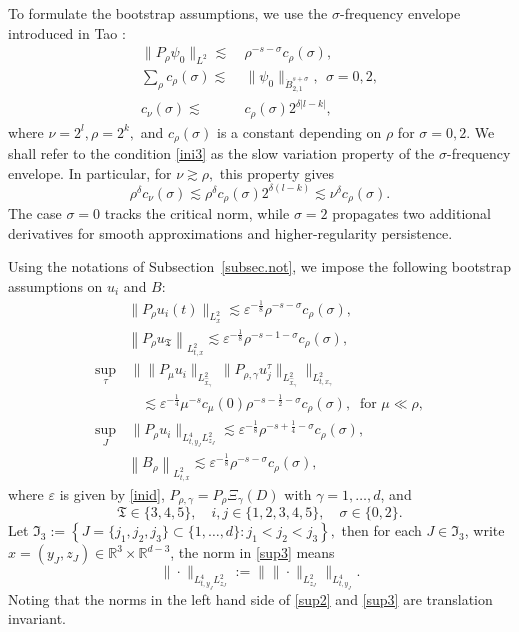 \documentclass[11pt,letterpaper,reqno]{amsart}
\numberwithin{equation}{section}
\theoremstyle{definition}
\theoremstyle{remark}
\begin{document}
To formulate the bootstrap assumptions,  we use the $\sigma$-frequency envelope  introduced in Tao \cite{Tao01}:
\begin{align}
	\|P_{\rho} \psi_0\|_{L^2} \lesssim &~\rho^{-s-\sigma} c_\rho (\sigma), \label{ini1}\\
	\sum_{\rho} c_\rho (\sigma) \lesssim &~\|\psi_0\|_{\dot{B}^{s+\sigma}_{2,1}}, ~~\sigma=0,2\label{ini2},\\
	c_\nu (\sigma)  \lesssim &~c_{\rho } (\sigma) 2^{\delta|l-k|} \label{ini3},
\end{align}
where $ \nu=2^l, \rho = 2^{k},$ and $ c_\rho (\sigma)$ is a constant depending on $ \rho $ for $  \sigma=0,2. $  We shall refer to the condition \eqref{ini3}
as the slow variation property of the $\sigma$-frequency envelope. In particular,
for $\nu\gtrsim \rho,$ this property gives
\[
       \rho^\delta c_\nu(\sigma)
        \lesssim  \rho^\delta c_\rho(\sigma)2^{\delta (l-k)}
        \lesssim  \nu^\delta c_\rho(\sigma).
\]
The case $\sigma=0$ tracks the critical norm, while $\sigma=2$ propagates two
additional derivatives for smooth approximations and higher-regularity persistence. 

Using the notations of Subsection~\ref{subsec.not}, we impose the
following bootstrap assumptions on $u_i$ and $B$:
\begin{align}
	&\|P_{\rho} u_i(t) \|_{L^2_x} \lesssim  \varepsilon^{-\frac18}\rho^{-s-\sigma} c_\rho (\sigma),\label{sup1}\\
	&\left\|P_{\rho }  u_{\mathfrak{T}}\right\|_{L^2_{t,x } }\lesssim   \varepsilon^{-\frac 18} \rho^{-s-1-\sigma} c_\rho(\sigma),\label{supV} \\
	\sup_{\tau}&\,  \big\| \|P_\mu u_i\|_{L^2_{\widehat{x}_\gamma}}   \  \| P_{\rho,\gamma} u_j^\tau\|_{L^2_{\widehat{x}_\gamma}}  \big\|_{L^2_{t,x_\gamma}} \label{sup2} \\
 &\quad \lesssim \varepsilon^{-\frac14} \mu^{-s} c_\mu(0)   \rho^{-s-\frac 12-\sigma} c_\rho(\sigma), ~	\text{ for } \mu\ll \rho,\nonumber\\
			\sup_J &\, \|  P_\rho u_i \|_{L^4_{t,y_J} L^2_{z_J}}  \lesssim \varepsilon^{-\frac18} \rho^{-s+\frac 14-\sigma} c_\rho(\sigma), \label{sup3}\\
	&\left\|  B_{\rho }\right\|_{L^2_{t,x } }\lesssim  \varepsilon^{-\frac 18} \rho^{-s-\sigma} c_\rho(\sigma)\label{supB2},
\end{align}
where $\varepsilon$ is given by \eqref{inid}, $P_{\rho,\gamma} = P_\rho \Xi_\gamma(D)$ with $\gamma = 1,\dots,d$,  and
\[
\mathfrak{T} \in \{3,4,5\},\quad i,j \in \{1,2,3,4,5\},\quad \sigma \in \{0,2\}.
\]
Let \(\mathfrak I_3:=
\left\{
J=\{j_1,j_2,j_3\}\subset\{1,\ldots,d\}:
j_1<j_2<j_3
\right\},\)
then for each \(J\in\mathfrak I_3\), write
\(
x=(y_{J},z_J)\in\mathbb R^3\times\mathbb R^{d-3}\), the norm in \eqref{sup3} means
\[
\| \cdot \|_{L^4_{t,y_J} L^2_{z_J}} := \big\| \| \cdot \|_{L_{z_J}^2} \big\|_{L_{t,y_{J}}^4}.
\]
 Noting that the norms in the left hand side of \eqref{sup2} and \eqref{sup3} are translation invariant.
\end{document}
